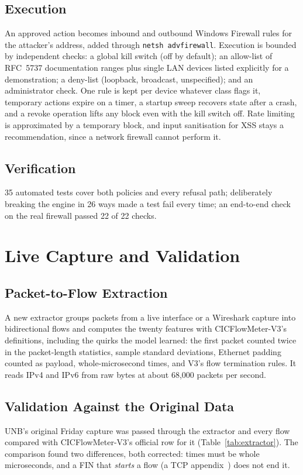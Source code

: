 \documentclass[conference]{IEEEtran}
\begin{document}
\subsection{Execution}
An approved action becomes inbound and outbound Windows Firewall rules for
the attacker's address, added through \texttt{netsh advfirewall}. Execution
is bounded by independent checks: a global kill switch (off by default); an
allow-list of RFC~5737 documentation ranges plus single LAN devices listed
explicitly for a demonstration; a deny-list (loopback, broadcast,
unspecified); and an administrator check. One rule is kept per device
whatever class flags it, temporary actions expire on a timer, a startup sweep
recovers state after a crash, and a revoke operation lifts any block even
with the kill switch off. Rate limiting is approximated by a temporary
block, and input sanitisation for XSS stays a recommendation, since a network
firewall cannot perform it.

\subsection{Verification}
35 automated tests cover both policies and every refusal path; deliberately
breaking the engine in 26 ways made a test fail every time; an end-to-end
check on the real firewall passed 22 of 22 checks.

\section{Live Capture and Validation}

\subsection{Packet-to-Flow Extraction}
A new extractor groups packets from a live interface or a Wireshark capture
into bidirectional flows and computes the twenty features with
CICFlowMeter-V3's definitions, including the quirks the model learned: the
first packet counted twice in the packet-length statistics, sample standard
deviations, Ethernet padding counted as payload, whole-microsecond times, and
V3's flow termination rules. It reads IPv4 and IPv6 from raw bytes at about
68{,}000 packets per second.

\subsection{Validation Against the Original Data}
UNB's original Friday capture was passed through the extractor and every flow
compared with CICFlowMeter-V3's official row for it
(Table~\ref{tab:extractor}). The comparison found two differences, both
corrected: times must be whole microseconds, and a FIN that \emph{starts} a
flow (a TCP appendix~\cite{ref4}) does not end it.
\end{document}
